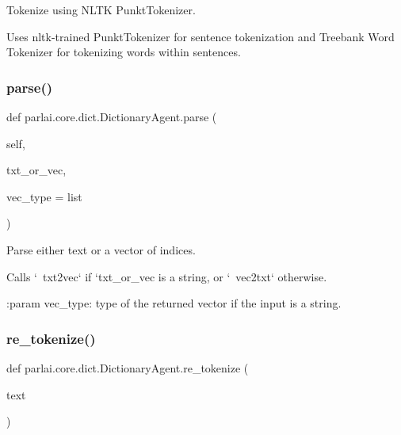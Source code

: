 \begin{DoxyVerb}Tokenize using NLTK PunktTokenizer.

Uses nltk-trained PunktTokenizer for sentence tokenization and Treebank Word
Tokenizer for tokenizing words within sentences.
\end{DoxyVerb}
 \mbox{\label{classparlai_1_1core_1_1dict_1_1DictionaryAgent_ad34c4135329f6768d22d519c3c483d68}} 
\subsubsection{\texorpdfstring{parse()}{parse()}}
{\footnotesize\ttfamily def parlai.\+core.\+dict.\+Dictionary\+Agent.\+parse (\begin{DoxyParamCaption}\item[{}]{self,  }\item[{}]{txt\+\_\+or\+\_\+vec,  }\item[{}]{vec\+\_\+type = {\ttfamily list} }\end{DoxyParamCaption})}

\begin{DoxyVerb}Parse either text or a vector of indices.

Calls `~txt2vec` if `txt_or_vec is a string, or `~vec2txt` otherwise.

:param vec_type:
    type of the returned vector if the input is a string.
\end{DoxyVerb}
 \mbox{\label{classparlai_1_1core_1_1dict_1_1DictionaryAgent_a78edf54954bf0514e1798ce694a758fe}} 
\subsubsection{\texorpdfstring{re\+\_\+tokenize()}{re\_tokenize()}}
{\footnotesize\ttfamily def parlai.\+core.\+dict.\+Dictionary\+Agent.\+re\+\_\+tokenize (\begin{DoxyParamCaption}\item[{}]{text }\end{DoxyParamCaption})\hspace{0.3cm}{\ttfamily [static]}}


